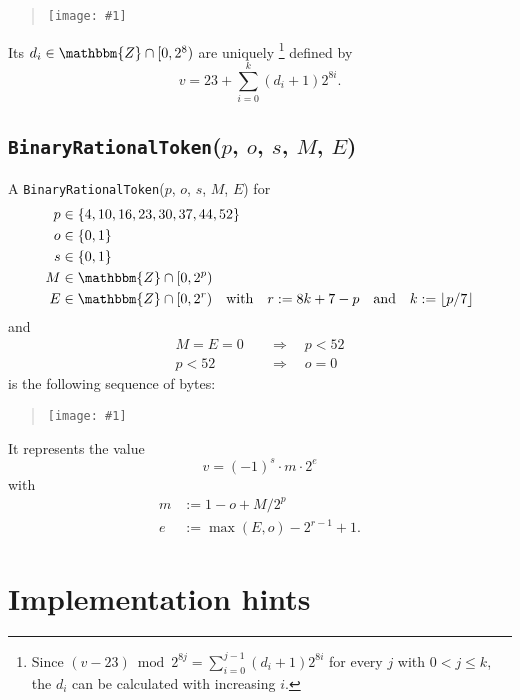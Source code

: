 \documentclass[headings=normal, headsepline, numbers=noenddot, fleqn, a4paper]{scrartcl}
\newcommand{\DborSyntaxIdent}[1]{\texttt{#1}}
\newcommand{\IncludeImageInPlace}[1]{%
    \begin{quotation}%
        \texttt{[image: \#1]}%
    \end{quotation}%
}
\begin{document}
    \IncludeImageInPlace{IntegerTokenB.pdf}

    Its $d_i \in \mathbbm{Z} \cap [0, 2^8)$ are uniquely%
    \footnote{%
        Since $(v - 23) \bmod 2^{8 j} = \sum_{i = 0}^{j - 1} (d_i + 1) 2^{8 i}$ for every $j$ with $0 < j \le k$,
        the $d_i$ can be calculated with increasing $i$.
    }
    defined by 
    \begin{equation}
        v = 23 + \sum_{i = 0}^k (d_i + 1) 2^{8 i}.
    \end{equation}

    
    \subsection{\DborSyntaxIdent{BinaryRationalToken}($p$, $o$, $s$, $M$, $E$)}
    \hypertarget{sec:def:BinaryRationalToken}{}

    A \DborSyntaxIdent{BinaryRationalToken}($p$, $o$, $s$, $M$, $E$) for
    \begin{align*}
        p & \in \{4, 10, 16, 23, 30, 37, 44, 52\} \\
        o & \in \{0, 1\} \\
        s & \in \{0, 1\} \\
        M & \in \mathbbm{Z} \cap [0, 2^p) \\
        E & \in \mathbbm{Z} \cap [0, 2^r) 
            \quad\text{with}\quad r := 8 k + 7 - p
            \quad\text{and}\quad k := \lfloor p / 7 \rfloor
    \end{align*}%
    and
    \begin{align*}
        M = E = 0 \quad & \Rightarrow \quad p < 52 \\
        p < 52 \quad & \Rightarrow \quad o = 0
    \end{align*}%
    is the following sequence of bytes:

    \IncludeImageInPlace{BinaryRationalToken.pdf}

    It represents the value
    \begin{equation}
        v = (-1)^s \cdot m \cdot 2^e
    \end{equation}
    with
    \begin{align*}
        m & := 1 - o + M / 2^p \\
        e & := \max(E, o) - 2^{r-1} + 1.
    \end{align*}

    \section{Implementation hints}
    \label{sec:implementation}
\end{document}
